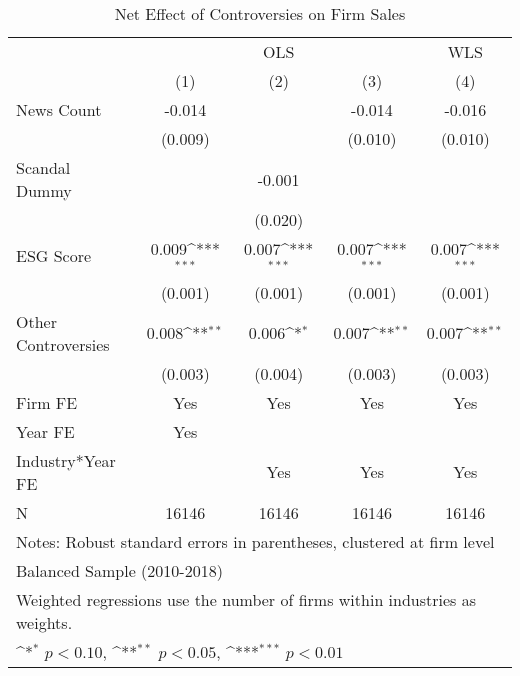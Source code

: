 \begin{table}[htbp]\centering
\def\sym#1{\ifmmode^{#1}\else\(^{#1}\)\fi}
\caption{Net Effect of Controversies on Firm Sales}
\begin{tabular}{l*{4}{c}}
\toprule
                    &\multicolumn{3}{c}{OLS}                                          &\multicolumn{1}{c}{WLS}\\\cmidrule(lr){2-4}\cmidrule(lr){5-5}
                    &\multicolumn{1}{c}{(1)}         &\multicolumn{1}{c}{(2)}         &\multicolumn{1}{c}{(3)}         &\multicolumn{1}{c}{(4)}         \\
\midrule
News Count          &      -0.014         &                     &      -0.014         &      -0.016         \\
                    &     (0.009)         &                     &     (0.010)         &     (0.010)         \\
\addlinespace
Scandal Dummy       &                     &      -0.001         &                     &                     \\
                    &                     &     (0.020)         &                     &                     \\
\addlinespace
ESG Score           &       0.009\sym{***}&       0.007\sym{***}&       0.007\sym{***}&       0.007\sym{***}\\
                    &     (0.001)         &     (0.001)         &     (0.001)         &     (0.001)         \\
\addlinespace
Other Controversies &       0.008\sym{**} &       0.006\sym{*}  &       0.007\sym{**} &       0.007\sym{**} \\
                    &     (0.003)         &     (0.004)         &     (0.003)         &     (0.003)         \\
\midrule
Firm FE             &         Yes         &         Yes         &         Yes         &         Yes         \\
Year FE             &         Yes         &                     &                     &                     \\
Industry*Year FE    &                     &         Yes         &         Yes         &         Yes         \\
N                   &       16146         &       16146         &       16146         &       16146         \\
\bottomrule
\multicolumn{5}{l}{\footnotesize Notes: Robust standard errors in parentheses, clustered at firm level}\\
\multicolumn{5}{l}{\footnotesize Balanced Sample (2010-2018)}\\
\multicolumn{5}{l}{\footnotesize Weighted regressions use the number of firms within industries as weights.}\\
\multicolumn{5}{l}{\footnotesize \sym{*} \(p<0.10\), \sym{**} \(p<0.05\), \sym{***} \(p<0.01\)}\\
\end{tabular}
\end{table}
